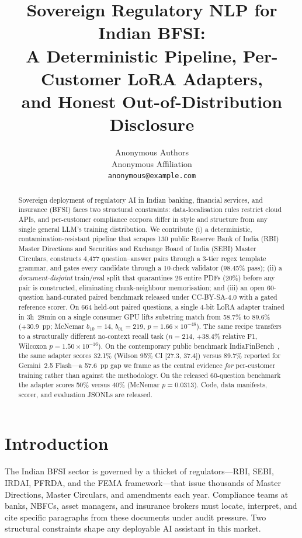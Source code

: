 \documentclass{article}
\title{Sovereign Regulatory NLP for Indian BFSI:\\A Deterministic Pipeline, Per-Customer LoRA Adapters,\\and Honest Out-of-Distribution Disclosure}
\author{%
  Anonymous Authors \\
  Anonymous Affiliation \\
  \texttt{anonymous@example.com} \\
}
\begin{document}
\maketitle

\begin{abstract}
Sovereign deployment of regulatory AI in Indian banking, financial services, and insurance (BFSI) faces two structural constraints: data-localisation rules restrict cloud APIs, and per-customer compliance corpora differ in style and structure from any single general LLM's training distribution. We contribute (i) a deterministic, contamination-resistant pipeline that scrapes 130 public Reserve Bank of India (RBI) Master Directions and Securities and Exchange Board of India (SEBI) Master Circulars, constructs 4{,}477 question--answer pairs through a 3-tier regex template grammar, and gates every candidate through a 10-check validator (98.45\% pass); (ii) a \emph{document-disjoint} train/eval split that quarantines 26 entire PDFs (20\%) before any pair is constructed, eliminating chunk-neighbour memorisation; and (iii) an open 60-question hand-curated paired benchmark released under CC-BY-SA-4.0 with a gated reference scorer. On 664 held-out paired questions, a single 4-bit LoRA adapter trained in 3h~28min on a single consumer GPU lifts substring match from 58.7\% to 89.6\% (+30.9~pp; McNemar $b_{10}{=}14$, $b_{01}{=}219$, $p{=}1.66\times10^{-48}$). The same recipe transfers to a structurally different no-context recall task ($n{=}214$, $+38.4\%$ relative F1, Wilcoxon $p{=}1.50\times10^{-16}$). On the contemporary public benchmark IndiaFinBench~\citep{pall2026indiafinbench}, the same adapter scores 32.1\% (Wilson 95\% CI [27.3, 37.4]) versus 89.7\% reported for Gemini~2.5 Flash---a 57.6~pp gap we frame as the central evidence \emph{for} per-customer training rather than against the methodology. On the released 60-question benchmark the adapter scores 50\% versus 40\% (McNemar $p{=}0.0313$). Code, data manifests, scorer, and evaluation JSONLs are released.
\end{abstract}

\section{Introduction}

The Indian BFSI sector is governed by a thicket of regulators---RBI, SEBI, IRDAI, PFRDA, and the FEMA framework---that issue thousands of Master Directions, Master Circulars, and amendments each year. Compliance teams at banks, NBFCs, asset managers, and insurance brokers must locate, interpret, and cite specific paragraphs from these documents under audit pressure. Two structural constraints shape any deployable AI assistant in this market.
\end{document}
